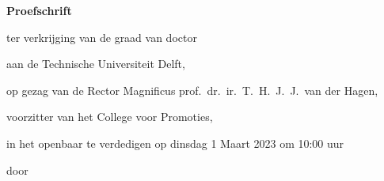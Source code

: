 \begin{titlepage}

\begin{center}

\vspace*{2\bigskipamount}

{\makeatletter
\titlestyle\singlespacing\bfseries\LARGE\@title\par
\makeatother}

{\makeatletter
\ifx\@subtitle\undefined\else
    \bigskip
    \titlefont\titleshape\Large\@subtitle
\fi
\makeatother}

\end{center}

\cleardoublepage
\thispagestyle{empty}

\begin{center}


\vspace*{2\bigskipamount}

{\makeatletter
\titlestyle\singlespacing\bfseries\LARGE\@title\par
\makeatother}

{\makeatletter
\ifx\@subtitle\undefined\else
    \bigskip
    \titlefont\titleshape\Large\@subtitle
\fi
\makeatother}


\vfill


{\Large\titlefont\bfseries Proefschrift}

\bigskip
\bigskip

ter verkrijging van de graad van doctor

aan de Technische Universiteit Delft,

op gezag van de Rector Magnificus prof.~dr.~ir.~T.~H.~J.~J.~van der Hagen,

voorzitter van het College voor Promoties,

in het openbaar te verdedigen op dinsdag 1 Maart 2023 om 10:00 uur

\bigskip
\bigskip

door

\bigskip
\bigskip


\end{center}
\end{titlepage}
